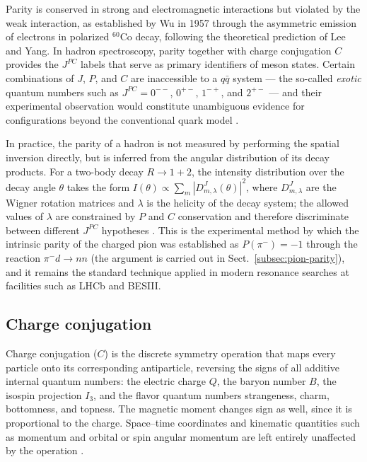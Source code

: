 Parity is conserved in strong and electromagnetic interactions but violated by the
weak interaction, as established by Wu in 1957 through the asymmetric emission of
electrons in polarized ${}^{60}$Co decay, following the theoretical prediction of Lee
and Yang. In hadron spectroscopy, parity together with charge conjugation $C$
provides the $J^{PC}$ labels that serve as primary identifiers of meson states.
Certain combinations of $J$, $P$, and $C$ are inaccessible to a $q\bar{q}$ system
--- the so-called \emph{exotic} quantum numbers such as $J^{PC} = 0^{--}$,
$0^{+-}$, $1^{-+}$, and $2^{+-}$ --- and their experimental observation would
constitute unambiguous evidence for configurations beyond the conventional quark
model \cite[Ch.~4]{Amsler2018}.
 
In practice, the parity of a hadron is not measured by performing the spatial
inversion directly, but is inferred from the angular distribution of its decay
products. For a two-body decay $R \to 1 + 2$, the intensity distribution over the
decay angle $\theta$ takes the form $I(\theta) \propto \sum_m |D^J_{m,\lambda}(\theta)|^2$,
where $D^J_{m,\lambda}$ are the Wigner rotation matrices and $\lambda$ is the helicity
of the decay system; the allowed values of $\lambda$ are constrained by $P$ and $C$
conservation and therefore discriminate between different $J^{PC}$ hypotheses
\cite[Ch.~18]{Amsler2018}. This is the experimental method by which the intrinsic
parity of the charged pion was established as $P(\pi^-) = -1$ through the reaction
$\pi^- d \to nn$ (the argument is carried out in
Sect.~\ref{subsec:pion-parity}), and it remains the standard technique applied in modern resonance
searches at facilities such as LHCb and BESIII.


\FloatBarrier

\subsection{Charge conjugation}
\label{subsec:charge-conjugation}

Charge conjugation ($C$) is the discrete symmetry operation that maps every
particle onto its corresponding antiparticle, reversing the signs of all additive
internal quantum numbers: the electric charge $Q$, the baryon number $B$, the
isospin projection $I_3$, and the flavor quantum numbers strangeness, charm,
bottomness, and topness. The magnetic moment changes sign as well, since it is
proportional to the charge. Space--time coordinates and kinematic quantities such
as momentum and orbital or spin angular momentum are left entirely unaffected by
the operation \cite[Ch.~3]{Amsler2018}.
 
